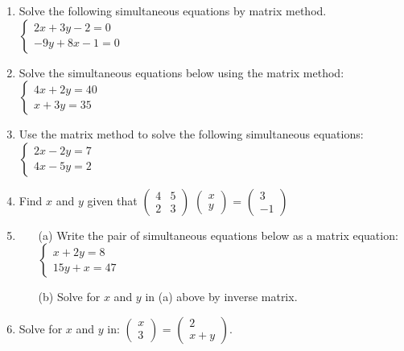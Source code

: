 \begin{enumerate}
	\item Solve the following simultaneous equations by matrix method.\\
	$\left\{
	\begin{array}{l}
	2x + 3y - 2 = 0\\
	-9y + 8x -1 = 0
	\end{array} \right.$
	
	\item Solve the simultaneous equations below using the matrix method:\\
	$\left\{
	\begin{array}{l}
	4x + 2y = 40\\
	x + 3y = 35
	\end{array} \right.$
	
	\item Use the matrix method to solve the following simultaneous equations:\\
	$\left\{
	\begin{array}{l}
	2x - 2y = 7\\
	4x - 5y = 2
	\end{array} \right.$
	
	\item Find $x$ and $y$ given that $
	\begin{pmatrix}
	4 & 5 \\
	2 & 3
	\end{pmatrix}$ $
	\begin{pmatrix}
	x \\
	y
	\end{pmatrix}$ = $
	\begin{pmatrix}
	3 \\
	-1
	\end{pmatrix}$
	
	\item 
		\begin{itemize}
		\item[(a)] Write the pair of simultaneous equations below as a matrix equation:\\
	$\left\{
	\begin{array}{l}
	x + 2y = 8\\
	15y + x = 47
	\end{array} \right.$
		\item[(b)] Solve for $x$ and $y$ in (a) above by inverse matrix.
		\end{itemize}
		
	\item Solve for $x$ and $y$ in: $
	\begin{pmatrix}
	x \\
	3
	\end{pmatrix}$ = $
	\begin{pmatrix}
	2 \\
	x + y
	\end{pmatrix}$.
	

\end{enumerate}
